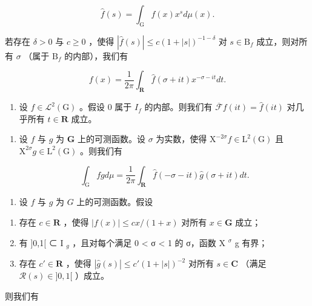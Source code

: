 \[
\widehat {f} (s) = \int_ {\mathrm{G}} f (x) x ^ {s} d \mu (x).
\]

若存在 \(\delta > 0\) 与 \(c \geqslant 0\) ，使得 \(|\widehat{f}(s)| \leqslant c(1 + |s|)^{-1 - \delta}\) 对 \(s \in \mathrm{B}_f\) 成立，则对所有 \(\sigma\) （属于 \(\mathrm{B}_f\) 的内部），我们有

\[
f (x) = \frac {1}{2 \pi} \int_ {\mathbf {R}} \widehat {f} (\sigma + i t) x ^ {- \sigma - i t} d t.
\]

\begin{enumerate}
\def\labelenumi{\alph{enumi})}
\setcounter{enumi}{2}
\tightlist
\item
  设 \(f \in \mathcal{L}^{2}(\mathrm{G})\) 。假设 0 属于 \(I_{f}\) 的内部。则我们有 \(\overline{\mathcal{F}} f(it) = \widehat{f}(it)\) 对几乎所有 \(t \in \mathbf{R}\) 成立。
\end{enumerate}

\begin{enumerate}
\def\labelenumi{\alph{enumi})}
\setcounter{enumi}{3}
\item
  设 \(f\) 与 \(g\) 为 \(\mathbf{G}\) 上的可测函数。设 \(\sigma\) 为实数，使得 \(\mathrm{X}^{-2\sigma}f\in \mathrm{L}^2 (\mathrm{G})\) 且 \(\mathrm{X}^{2\sigma}g\in \mathrm{L}^2 (\mathrm{G})\) 。则我们有

\[
\int_ {\mathrm{G}} f g d \mu = \frac {1}{2 \pi} \int_ {\mathbf {R}} \widehat {f} (- \sigma - i t) \widehat {g} (\sigma + i t) d t.
\]

\end{enumerate}

\begin{enumerate}
\def\labelenumi{\alph{enumi})}
\setcounter{enumi}{4}
\tightlist
\item
  设 \(f\) 与 \(g\) 为 \(G\) 上的可测函数。假设
\end{enumerate}

\begin{enumerate}
\def\labelenumi{(\roman{enumi})}
\item
  存在 \(c \in \mathbf{R}\) ，使得 \(|f(x)| \leqslant cx / (1 + x)\) 对所有 \(x \in \mathbf{G}\) 成立；
\item
  有 ]0,1[ ⊂ I \(_{g}\) ，且对每个满足 0 < σ < 1 的 σ，函数 X \(^{\sigma}\) g 有界；
\item
  存在 \(c' \in \mathbf{R}\) ，使得 \(|\widehat{g}(s)| \leqslant c'(1 + |s|)^{-2}\) 对所有 \(s \in \mathbf{C}\) （满足 \(\mathcal{R}(s) \in ]0, 1[\) ）成立。
\end{enumerate}

则我们有

